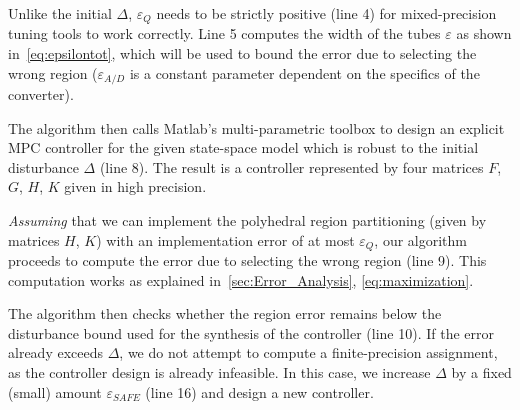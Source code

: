
Unlike the initial $\Delta$, $\varepsilon_Q$ needs to be strictly positive (line 4)
for mixed-precision tuning tools to work correctly.
Line 5 computes the width of the tubes $\varepsilon$ as shown in~\autoref{eq:epsilontot},
which will be used to bound the error due to selecting the wrong region
($\varepsilon_{A/D}$ is a constant parameter dependent on the specifics of the
converter).

The algorithm then calls Matlab's multi-parametric toolbox to design an explicit
MPC controller for the given state-space model which is robust to the initial
disturbance $\Delta$ (line 8). The result is a controller represented by four matrices
$F$, $G$, $H$, $K$ given in high precision.

\emph{Assuming} that we can implement the polyhedral region partitioning (given by
matrices $H$, $K$) with an implementation error of at most $\varepsilon_Q$,
our algorithm proceeds to compute the error due to selecting the wrong region (line 9).
This computation works as explained in~\autoref{sec:Error_Analysis}, \autoref{eq:maximization}.



The algorithm then checks whether the region error remains below the disturbance
bound used for the synthesis of the controller (line 10). 
If the error already exceeds $\Delta$, we do not attempt to compute a finite-precision
assignment, as the controller design is already infeasible.
In this case, we increase $\Delta$ by a fixed (small) amount $\varepsilon_{SAFE}$ (line 16) and 
design a new controller. 

